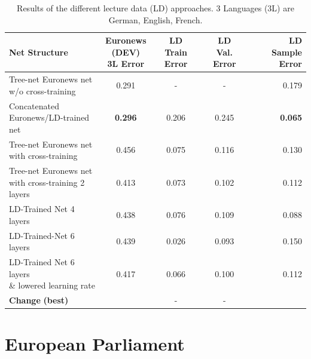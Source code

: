 \begin{table}
\caption{Results of the different lecture data (LD) approaches. 3 Languages (3L) are German, English, French.}
\label{tab:resultsLD}
\begin{tabular}{| l | c | c | c | r | }
	\hline
	\textbf{Net Structure} & \parbox[t]{2cm}{\textbf{Euronews} \\ \textbf{(DEV)} \\ \textbf{3L Error}} & \parbox[t]{2cm}{\textbf{LD} \\ \textbf{Train} \textbf{Error}} & \parbox[t]{2cm}{\textbf{LD} \\ \textbf{Val. Error}} & \parbox[t]{2.5cm}{\textbf{LD} \\ \textbf{Sample Error}} \\
	\hline
	\parbox[t]{4.2cm}{Tree-net Euronews net \\
	 w/o cross-training}  & 0.291 & - & - & 0.179 \\
	\hline
	\parbox[t]{4.2cm}{Concatenated \\ Euronews/LD-trained net } & \textbf{0.296} & 0.206 & 0.245 & \textbf{0.065} \\
	\hdashline
	\parbox[t]{4.2cm}{Tree-net Euronews net \\ with cross-training } & 0.456 & 0.075 & 0.116 & 0.130 \\
	\hdashline
	\parbox[t]{4.2cm}{Tree-net Euronews net \\ with cross-training 2 layers } & 0.413 & 0.073 & 0.102 & 0.112 \\
	\hdashline
	\parbox[t]{4.2cm}{LD-Trained Net 4 layers} & 0.438 & 0.076 & 0.109 & 0.088 \\
	\hdashline
	\parbox[t]{4.2cm}{LD-Trained-Net 6 layers} & 0.439 & 0.026 & 0.093 & 0.150 \\
	\hdashline
	\parbox[t]{4.2cm}{LD-Trained Net 6 layers \\ \& lowered learning rate} & 0.417 & 0.066 & 0.100 & 0.112 \\
	\hline
	\parbox[t]{4.2cm}{\textbf{Change} \textbf{(best)}} &  & - & - &  \\
	\hline
\end{tabular}
\end{table}

\section{European Parliament}
\label{sec:EP}

